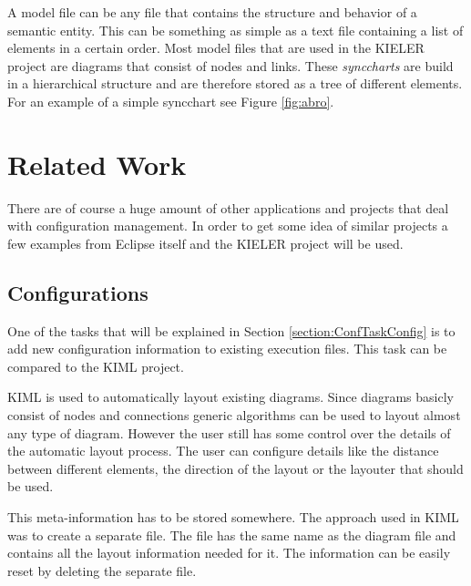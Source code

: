 A model file can be any file that contains the structure and behavior of a semantic entity. This can be something as
simple as a text file containing a list of elements in a certain order. Most model files that are used in
the \ac{KIELER} project are diagrams that consist of nodes and links. These \textit{synccharts} are build in
a hierarchical structure and are therefore stored as a tree of different elements. For an example of a simple
syncchart see Figure \ref{fig:abro}.

\section{Related Work}
\label{section:RelatedWork}
There are of course a huge amount of other applications and projects that deal
with configuration management. In order to get some idea of similar projects
a few examples from Eclipse itself and the \ac{KIELER} project will be used.

\subsection{Configurations}
\label{section:RelatedConf}
One of the tasks that will be explained in Section \ref{section:ConfTaskConfig} is to add new
configuration information to existing execution files. This task can be compared to
the \ac{KIML} project. 

\ac{KIML} is used to automatically layout existing diagrams. Since diagrams basicly consist of nodes and
connections generic algorithms can be used to layout almost any type of diagram. However the user still
has some control over the details of the automatic layout process. The user can configure details like
the distance between different elements, the direction of the layout or the layouter that should be used.

This meta-information has to be stored somewhere. The approach used in \ac{KIML} was to create a separate
file. The file has the same name as the diagram file and contains all the layout information needed for it.
The information can be easily reset by deleting the separate file. 
